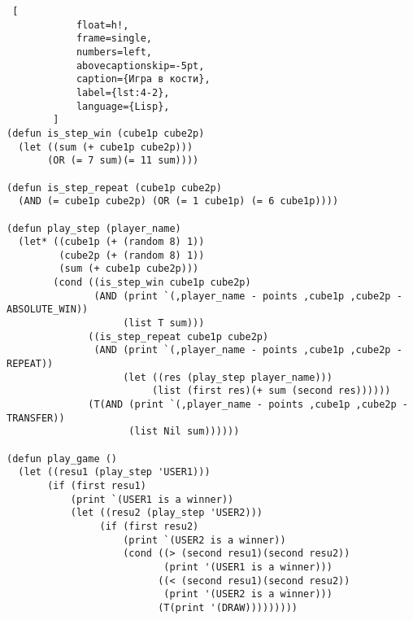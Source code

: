         \begin{lstlisting} [
            float=h!,
            frame=single,
            numbers=left,
            abovecaptionskip=-5pt,
            caption={Игра в кости},
            label={lst:4-2},
            language={Lisp},
        ]
(defun is_step_win (cube1p cube2p)
  (let ((sum (+ cube1p cube2p)))
       (OR (= 7 sum)(= 11 sum))))

(defun is_step_repeat (cube1p cube2p)
  (AND (= cube1p cube2p) (OR (= 1 cube1p) (= 6 cube1p))))

(defun play_step (player_name)
  (let* ((cube1p (+ (random 8) 1))
         (cube2p (+ (random 8) 1))
         (sum (+ cube1p cube2p)))
        (cond ((is_step_win cube1p cube2p)
               (AND (print `(,player_name - points ,cube1p ,cube2p - ABSOLUTE_WIN))
                    (list T sum)))
              ((is_step_repeat cube1p cube2p)
               (AND (print `(,player_name - points ,cube1p ,cube2p - REPEAT))
                    (let ((res (play_step player_name)))
                         (list (first res)(+ sum (second res))))))
              (T(AND (print `(,player_name - points ,cube1p ,cube2p - TRANSFER))
                     (list Nil sum))))))

(defun play_game ()
  (let ((resu1 (play_step 'USER1)))
       (if (first resu1)
           (print `(USER1 is a winner))
           (let ((resu2 (play_step 'USER2)))
                (if (first resu2)
                    (print `(USER2 is a winner))
                    (cond ((> (second resu1)(second resu2))
                           (print '(USER1 is a winner)))
                          ((< (second resu1)(second resu2))
                           (print '(USER2 is a winner)))
                          (T(print '(DRAW)))))))))
        \end{lstlisting}
    